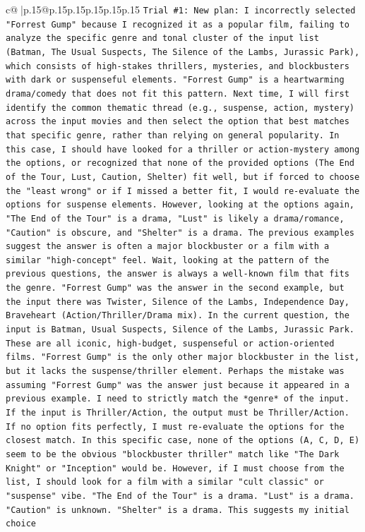 \documentclass{article}
\begin{document}
{\begin{supertabular}{c@{$\;$}|p{.15\linewidth}@{}p{.15\linewidth}p{.15\linewidth}p{.15\linewidth}p{.15\linewidth}p{.15\linewidth}}
{{{\texttt{Trial \#1: New plan: I incorrectly selected "Forrest Gump" because I recognized it as a popular film, failing to analyze the specific genre and tonal cluster of the input list (Batman, The Usual Suspects, The Silence of the Lambs, Jurassic Park), which consists of high{-}stakes thrillers, mysteries, and blockbusters with dark or suspenseful elements. "Forrest Gump" is a heartwarming drama/comedy that does not fit this pattern. Next time, I will first identify the common thematic thread (e.g., suspense, action, mystery) across the input movies and then select the option that best matches that specific genre, rather than relying on general popularity. In this case, I should have looked for a thriller or action{-}mystery among the options, or recognized that none of the provided options (The End of the Tour, Lust, Caution, Shelter) fit well, but if forced to choose the "least wrong" or if I missed a better fit, I would re{-}evaluate the options for suspense elements. However, looking at the options again, "The End of the Tour" is a drama, "Lust" is likely a drama/romance, "Caution" is obscure, and "Shelter" is a drama. The previous examples suggest the answer is often a major blockbuster or a film with a similar "high{-}concept" feel. Wait, looking at the pattern of the previous questions, the answer is always a well{-}known film that fits the genre. "Forrest Gump" was the answer in the second example, but the input there was Twister, Silence of the Lambs, Independence Day, Braveheart (Action/Thriller/Drama mix). In the current question, the input is Batman, Usual Suspects, Silence of the Lambs, Jurassic Park. These are all iconic, high{-}budget, suspenseful or action{-}oriented films. "Forrest Gump" is the only other major blockbuster in the list, but it lacks the suspense/thriller element. Perhaps the mistake was assuming "Forrest Gump" was the answer just because it appeared in a previous example. I need to strictly match the *genre* of the input. If the input is Thriller/Action, the output must be Thriller/Action. If no option fits perfectly, I must re{-}evaluate the options for the closest match. In this specific case, none of the options (A, C, D, E) seem to be the obvious "blockbuster thriller" match like "The Dark Knight" or "Inception" would be. However, if I must choose from the list, I should look for a film with a similar "cult classic" or "suspense" vibe. "The End of the Tour" is a drama. "Lust" is a drama. "Caution" is unknown. "Shelter" is a drama. This suggests my initial choice} \\
\\ 
}}}
\end{supertabular}}
\end{document}
